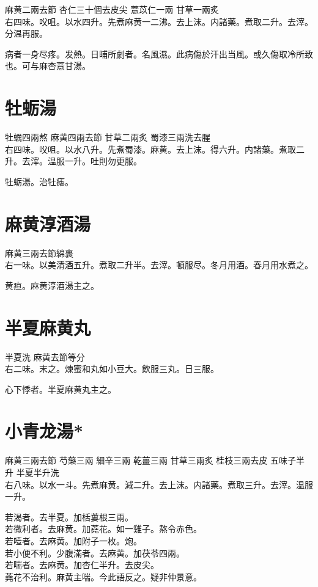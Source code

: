 麻黄{\scriptsize 二兩去節} 杏仁{\scriptsize 三十個去皮尖} 薏苡仁{\scriptsize 一兩} 甘草{\scriptsize 一兩炙}\\
右四味。㕮咀。以水四升。先煮麻黄一二沸。去上沫。内諸藥。煮取二升。去滓。分温再服。

病者一身尽疼。发熱。日晡所劇者。名風濕。此病傷於汗出当風。或久傷取冷所致也。可与麻杏薏甘湯。

\section{牡蛎湯}

牡蠣{\scriptsize 四兩熬} 麻黄{\scriptsize 四兩去節} 甘草{\scriptsize 二兩炙} 蜀漆{\scriptsize 三兩洗去腥}\\
右四味。㕮咀。以水八升。先煮蜀漆。麻黄。去上沫。得六升。内諸藥。煮取二升。去滓。温服一升。吐則勿更服。

牡蛎湯。治牡瘧。

\section{麻黄淳酒湯}

麻黄{\scriptsize 三兩去節綿裹}\\
右一味。以美清酒五升。煮取二升半。去滓。頓服尽。冬月用酒。春月用水煮之。

黄疸。麻黄淳酒湯主之。

\section{半夏麻黄丸}

半夏{\scriptsize 洗} 麻黄{\scriptsize 去節等分}\\
右二味。末之。煉蜜和丸如小豆大。飲服三丸。日三服。

心下悸者。半夏麻黄丸主之。

\section{小青龙湯*}

麻黄{\scriptsize 三兩去節} 芍藥{\scriptsize 三兩} 細辛{\scriptsize 三兩} 乾薑{\scriptsize 三兩} 甘草{\scriptsize 三兩炙} 桂枝{\scriptsize 三兩去皮} 五味子{\scriptsize 半升} 半夏{\scriptsize 半升洗}\\
右八味。以水一斗。先煮麻黄。減二升。去上沫。内諸藥。煮取三升。去滓。温服一升。

若渴者。去半夏。加栝蔞根三兩。\\
若微利者。去麻黄。加蕘花。如一雞子。熬令赤色。\\
若噎者。去麻黄。加附子一枚。炮。\\
若小便不利。少腹滿者。去麻黄。加茯苓四兩。\\
若喘者。去麻黄。加杏仁半升。去皮尖。\\
蕘花不治利。麻黄主喘。今此語反之。疑非仲景意。

